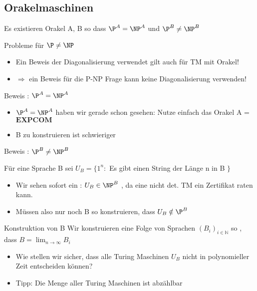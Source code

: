 \subsection[Orakelmaschinen]{Orakelmaschinen}

\begin{frame}
	\begin{Satz}
		Es existieren Orakel A, B so dass ${\P}^A = {\NP}^A$ und ${\P}^B \neq {\NP}^B$
	\end{Satz}
\end{frame}

\begin{frame}{Probleme für $\P \neq \NP$}
	\begin{itemize}[<+->]
	\item Ein Beweis der Diagonalisierung verwendet gilt auch für TM mit Orakel!
	\item $\Rightarrow$ ein Beweis für die P-NP Frage kann keine Diagonalisierung verwenden!
	\end{itemize}
\end{frame}

\begin{frame}{Beweis : ${\P}^A = {\NP}^A$ }
	\begin{itemize}[<+->]
	
	\item ${\P}^A = {\NP}^A$ haben wir gerade schon gesehen:
			Nutze einfach das Orakel A = $\mathbf{EXPCOM}$
	\item B zu konstruieren ist schwieriger
	\end{itemize}	
\end{frame}

\begin{frame}{Beweis : ${\P}^B \neq {\NP}^B$}
	\begin{Definition}
		Für eine Sprache B sei $U_B = \lbrace 1^n :$ Es gibt einen String
		der L\"ange n in B $\rbrace $
	\end{Definition}	
	\pause
	
	\begin{itemize}[<+->]
		\item Wir sehen sofort ein : $U_B \in {\NP}^B$ , da eine nicht det. TM
			ein Zertifikat raten kann.
		\item M\"ussen also nur noch B so konstruieren, dass $U_B \notin {\P}^B$
	\end{itemize}
\end{frame}

\begin{frame}{Konstruktion von B}
	Wir konstruieren eine Folge von Sprachen $(B_i)_{i \in \mathbb{N}}$ so , dass 
	$B = \lim_{n \to \infty} B_i$	
	\begin{itemize}[<+->]
		\item Wie stellen wir sicher, dass alle Turing Maschinen $U_B$ nicht
			in polynomieller Zeit entscheiden können?
		\item Tipp: Die Menge aller Turing Maschinen ist abzählbar
	\end{itemize}
\end{frame}

